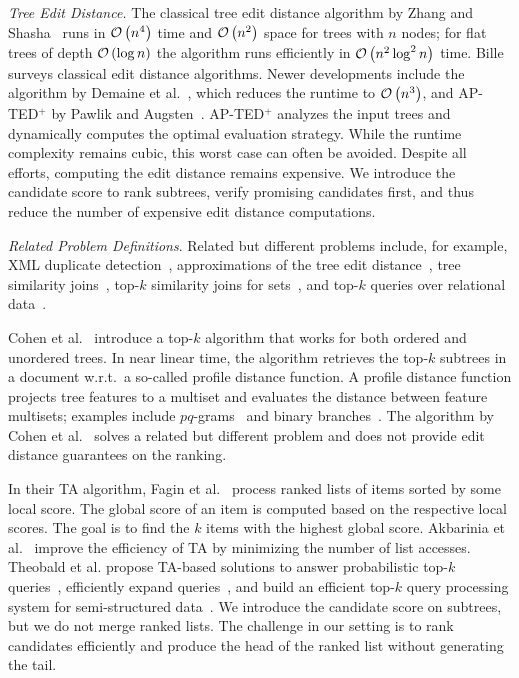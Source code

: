 \emph{Tree Edit Distance.} The classical tree edit distance algorithm by Zhang and Shasha~\cite{zhang-siam-1989} runs in $\mathcal{O} \left( n^4 \right)$ time and $\mathcal{O} \left( n^2 \right)$ space for trees with $n$ nodes; for flat trees of depth $\mathcal{O} \left( \log n \right)$ the algorithm runs efficiently in $\mathcal{O} \left( n^2\log^2 n \right)$ time. Bille~\cite{bille-tcs-2005} surveys classical edit distance algorithms.
%
Newer developments include the algorithm by Demaine et al.~\cite{demaine-talg-2009}, which reduces the runtime to $\mathcal{O} \left( n^3 \right)$, and AP-TED$^+$ by Pawlik and Augsten~\cite{pawlik-infsys-2016}. AP-TED$^+$ analyzes the input trees and dynamically computes the optimal evaluation strategy. While the runtime complexity remains cubic, this worst case can often be avoided. Despite all efforts, computing the edit distance remains expensive. We introduce the candidate score to rank  subtrees, verify promising candidates first, and thus reduce the number of expensive edit distance computations.

\emph{Related Problem Definitions}. Related but different problems include, for example, XML duplicate detection~\cite{puhlmann-edbt-2016,calado-book-2010}, approximations of the tree edit distance~\cite{yang-sigmod-2005, augsten-vldb-2005}, tree similarity joins~\cite{tang-vldb-2015}, top-$k$ similarity joins for sets~\cite{xiao-icde-2009}, and top-$k$ queries over relational data~\cite{ilyas-acmcs-2008}.

Cohen et al.~\cite{cohen-icde-2014} introduce a top-$k$ algorithm that works for both ordered and unordered trees. In near linear time, the algorithm retrieves the top-$k$ subtrees in a document w.r.t.\ a so-called profile distance function. A profile distance function projects tree features to a multiset and evaluates the distance between feature multisets; examples include $pq$-grams~\cite{augsten-vldb-2005} and binary branches~\cite{yang-sigmod-2005}. The algorithm by Cohen et al.~\cite{cohen-icde-2014} solves a related but different problem and does not provide edit distance guarantees on the ranking.

In their TA algorithm, Fagin et al.~\cite{fagin-pods-2001, fagin-jcss-2003} process ranked lists of items sorted by some local score. The global score of an item is computed based on the respective local scores. The goal is to find the $k$ items with the highest global score. Akbarinia et al.~\cite{akbarinia-vldb-2007} improve the efficiency of TA by minimizing the number of list accesses.
%
Theobald et al. propose TA-based solutions to answer probabilistic top-$k$ queries~\cite{theobald-vldb-2004}, efficiently expand queries~\cite{theobald-sigir-2005}, and build an efficient top-$k$ query processing system for semi-structured data~\cite{theobald-vldbj-2008}. We introduce the candidate score on subtrees, but we do not merge ranked lists. The challenge in our setting is to rank candidates efficiently and produce the head of the ranked list without generating the tail.
